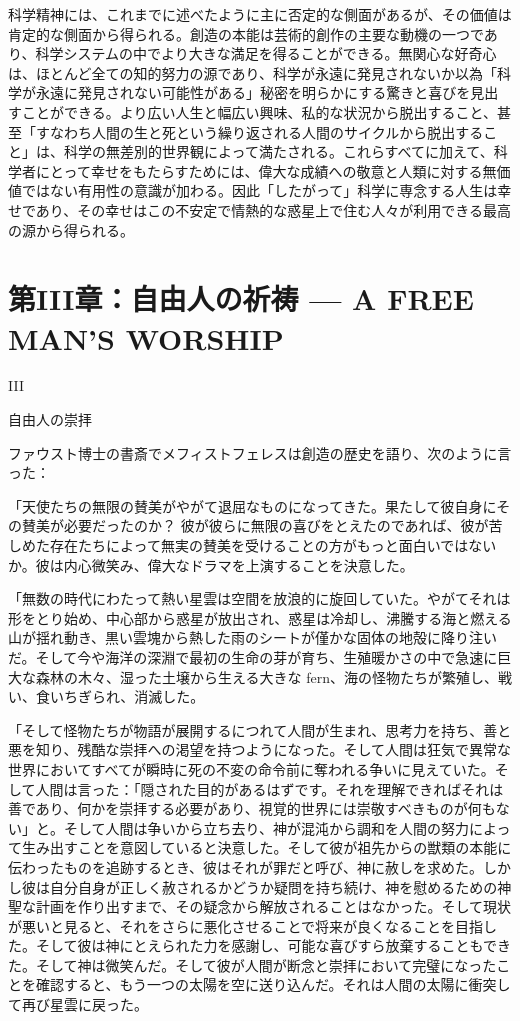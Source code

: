 \documentclass[a4paper,11pt,openany]{ltjsbook}
\begin{document}
科学精神には、これまでに述べたように主に否定的な側面があるが、その価値は肯定的な側面から得られる。創造の本能は芸術的創作の主要な動機の一つであり、科学システムの中でより大きな満足を得ることができる。無関心な好奇心は、ほとんど全ての知的努力の源であり、科学が永遠に発見されないか以為「科学が永遠に発見されない可能性がある」秘密を明らかにする驚きと喜びを見出すことができる。より広い人生と幅広い興味、私的な状況から脱出すること、甚至「すなわち人間の生と死という繰り返される人間のサイクルから脱出すること」は、科学の無差別的世界観によって満たされる。これらすべてに加えて、科学者にとって幸せをもたらすためには、偉大な成績への敬意と人類に対する無価値ではない有用性の意識が加わる。因此「したがって」科学に専念する人生は幸せであり、その幸せはこの不安定で情熱的な惑星上で住む人々が利用できる最高の源から得られる。


\chapter{第III章：自由人の祈祷 --- {A FREE MAN'S WORSHIP}}

III

自由人の崇拝


ファウスト博士の書斎でメフィストフェレスは創造の歴史を語り、次のように言った：

「天使たちの無限の賛美がやがて退屈なものになってきた。果たして彼自身にその賛美が必要だったのか？ 彼が彼らに無限の喜びをとえたのであれば、彼が苦しめた存在たちによって無実の賛美を受けることの方がもっと面白いではないか。彼は内心微笑み、偉大なドラマを上演することを決意した。

「無数の時代にわたって熱い星雲は空間を放浪的に旋回していた。やがてそれは形をとり始め、中心部から惑星が放出され、惑星は冷却し、沸騰する海と燃える山が揺れ動き、黒い雲塊から熱した雨のシートが僅かな固体の地殻に降り注いだ。そして今や海洋の深淵で最初の生命の芽が育ち、生殖暖かさの中で急速に巨大な森林の木々、湿った土壌から生える大きな fern、海の怪物たちが繁殖し、戦い、食いちぎられ、消滅した。

「そして怪物たちが物語が展開するにつれて人間が生まれ、思考力を持ち、善と悪を知り、残酷な崇拝への渇望を持つようになった。そして人間は狂気で異常な世界においてすべてが瞬時に死の不変の命令前に奪われる争いに見えていた。そして人間は言った：「隠された目的があるはずです。それを理解できればそれは善であり、何かを崇拝する必要があり、視覚的世界には崇敬すべきものが何もない」と。そして人間は争いから立ち去り、神が混沌から調和を人間の努力によって生み出すことを意図していると決意した。そして彼が祖先からの獣類の本能に伝わったものを追跡するとき、彼はそれが罪だと呼び、神に赦しを求めた。しかし彼は自分自身が正しく赦されるかどうか疑問を持ち続け、神を慰めるための神聖な計画を作り出すまで、その疑念から解放されることはなかった。そして現状が悪いと見ると、それをさらに悪化させることで将来が良くなることを目指した。そして彼は神にとえられた力を感謝し、可能な喜びすら放棄することもできた。そして神は微笑んだ。そして彼が人間が断念と崇拝において完璧になったことを確認すると、もう一つの太陽を空に送り込んだ。それは人間の太陽に衝突して再び星雲に戻った。
\end{document}
